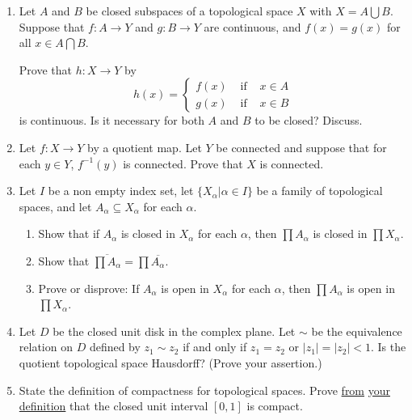 \begin{enumerate}

\item Let $A$ and $B$ be closed subspaces of a topological space $X$ 
        with  $X = A \bigcup B$. Suppose that $f: A \rightarrow Y$ and 
        $g: B \rightarrow Y$ are continuous, and $f(x)=g(x)$
        for all $x \in A \bigcap B$. 

\noindent Prove that $h: X \rightarrow Y$ by 
$$ h(x) = \left\{ \begin{array}{ccc}
            f(x)  & \mbox { if } & x \in A \\
            g(x)  & \mbox { if } & x \in B
          \end{array} \right. $$
is continuous. Is it necessary for both $A$ and $B$ to be closed?
Discuss.

\item Let $f : X \rightarrow Y$ by a quotient map. Let $Y$ be connected
and suppose that for each $y \in Y$, $f^{-1}(y)$ is connected. Prove
that $X$ is connected.

\item Let $I$ be a non empty index set, let 
$\{ X_{\alpha} | \alpha \in I \}$ be a family of topological spaces, and let
$A_{\alpha} \subseteq X_{\alpha}$ for each $\alpha$. 
      \begin{enumerate}
        \item Show that if $A_{\alpha}$ is closed in $X_{\alpha}$ for
              each $\alpha$, then $\prod A_{\alpha}$ is closed in 
              $\prod X_{\alpha}$.
        \item Show that ${\overline{\prod A_{\alpha}}} 
                      = \prod {\overline {A_{\alpha}}}$.
        \item Prove or disprove: If $A_{\alpha}$ is open in $X_{\alpha}$
              for each $\alpha$, then $\prod A_{\alpha}$ is open in 
              $\prod X_{\alpha}$.
       \end{enumerate}

\item Let $D$ be the closed unit disk in the complex plane. Let 
        $\sim$ be the equivalence relation on $D$ defined by 
        $z_{1} \sim z_{2}$ if and only if $z_{1} = z_{2}$ or 
        $|z_{1}| = |z_{2}| < 1$. Is the quotient
        topological space Hausdorff? (Prove your assertion.) 

\item State the definition of compactness for topological spaces. Prove
        {\underline{from}} {\underline{your definition}} 
        that the closed unit interval $[0,1]$ is compact.

\end{enumerate}

